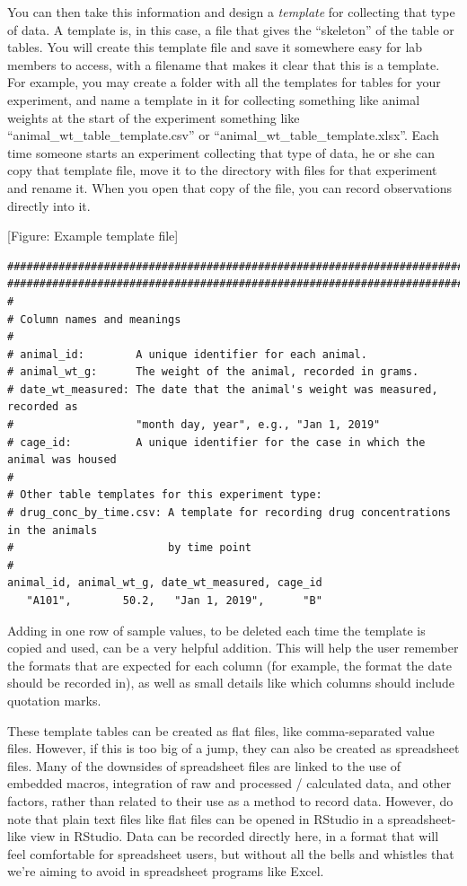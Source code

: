 \documentclass[]{tufte-book}
\begin{document}
You can then take this information and design a \emph{template} for collecting that
type of data. A template is, in this case, a file that gives the ``skeleton'' of
the table or tables. You will create this template file and save it somewhere
easy for lab members to access, with a filename that makes it clear that this is
a template. For example, you may create a folder with all the templates for
tables for your experiment, and name a template in it for collecting something
like animal weights at the start of the experiment something like
``animal\_wt\_table\_template.csv'' or ``animal\_wt\_table\_template.xlsx''.
Each time someone starts an experiment collecting that type of data, he or she
can copy that template file, move it to the directory with files for that
experiment and rename it. When you open that copy of the file, you can record
observations directly into it.

{[}Figure: Example template file{]}

\begin{verbatim}
####################################################################################
####################################################################################
#
# Column names and meanings
#
# animal_id:        A unique identifier for each animal. 
# animal_wt_g:      The weight of the animal, recorded in grams. 
# date_wt_measured: The date that the animal's weight was measured, recorded as 
#                   "month day, year", e.g., "Jan 1, 2019"
# cage_id:          A unique identifier for the case in which the animal was housed
# 
# Other table templates for this experiment type: 
# drug_conc_by_time.csv: A template for recording drug concentrations in the animals
#                        by time point
# 
animal_id, animal_wt_g, date_wt_measured, cage_id
   "A101",        50.2,   "Jan 1, 2019",      "B"    
\end{verbatim}

Adding in one row of sample values, to be deleted each time the template is
copied and used, can be a very helpful addition. This will help the user remember
the formats that are expected for each column (for example, the format the
date should be recorded in), as well as small details like which columns should
include quotation marks.

These template tables can be created as flat files, like comma-separated value
files. However, if this is too big of a jump, they can also be created as
spreadsheet files. Many of the downsides of spreadsheet files are linked to
the use of embedded macros, integration of raw and processed / calculated data,
and other factors, rather than related to their use as a method to record data.
However, do note that plain text files like flat files can be opened in RStudio
in a spreadsheet-like view in RStudio. Data can be recorded directly here, in
a format that will feel comfortable for spreadsheet users, but without all the
bells and whistles that we're aiming to avoid in spreadsheet programs like Excel.
\end{document}
